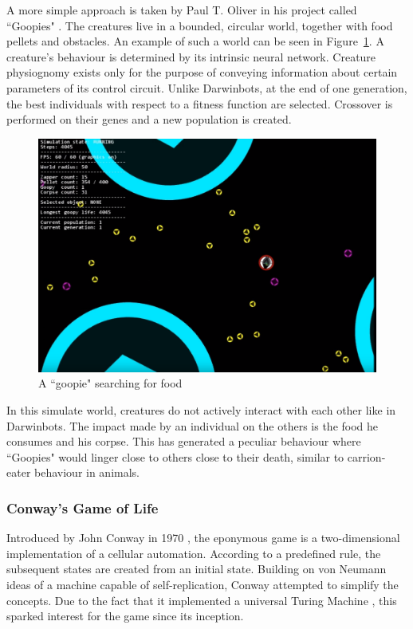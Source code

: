 A more simple approach is taken by Paul T. Oliver in his project called ``Goopies" \cite{goopies}. The creatures live in a bounded, circular world, together with food pellets and obstacles. An example of such a world can be seen in Figure~\ref{fig:goop}. A creature's behaviour is determined by its intrinsic neural network. Creature physiognomy exists only for the purpose of conveying information about certain parameters of its control circuit. Unlike Darwinbots, at the end of one generation, the best individuals with respect to a fitness function are selected. Crossover is performed on their genes and a new population is created.

\begin{figure}[!th]
	\centering
	\includegraphics[scale=0.3]{images/guppies}
	\caption{\label{fig:goop}A ``goopie" searching for food}
\end{figure}

In this simulate world, creatures do not actively interact with each other like in Darwinbots. The impact made by an individual on the others is the food he consumes and his corpse. This has generated a peculiar behaviour where ``Goopies" would linger close to others close to their death, similar to carrion-eater behaviour in animals.


\subsubsection{Conway's Game of Life}
Introduced by John Conway in 1970 \cite{gardner1970mathematical}, the eponymous game is a two-dimensional implementation of a cellular automation. According to a predefined rule, the subsequent states are created from an initial state. Building on von Neumann ideas of a machine capable of self-replication, Conway attempted to simplify the concepts. Due to the fact that it implemented a universal Turing Machine \cite{igblan}, this sparked interest for the game since its inception.

